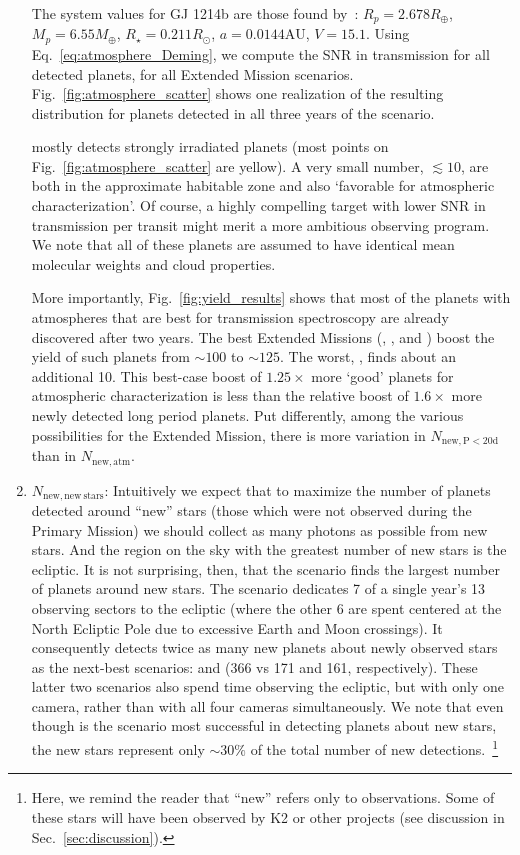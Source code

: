 \begin{enumerate}
	The system values for GJ 1214b are those found
	by~\citet{charbonneau_gj1214b_2009}: $R_p = 2.678R_\oplus$, $M_p = 6.55M_\oplus$,
	$R_\star = 0.211R_\odot$, $a = 0.0144\mathrm{AU}$, $V = 15.1$.
	Using Eq.~\ref{eq:atmosphere_Deming}, we compute the SNR in transmission for all detected planets, for all Extended Mission scenarios.
	Fig.~\ref{fig:atmosphere_scatter} shows one realization of the resulting distribution for planets detected in all three years of the \npole\:scenario.

	\tess mostly detects strongly irradiated planets (most points on Fig.~\ref{fig:atmosphere_scatter} are yellow).
	A very small number, $\lesssim 10$, are both in the approximate habitable zone and also `favorable for atmospheric characterization'.
	Of course, a highly compelling target with lower SNR in transmission per transit might merit a more ambitious \jwst observing program.
	We note that all of these planets are assumed to have identical mean molecular weights and cloud properties.

	More importantly, Fig.~\ref{fig:yield_results} shows that most of the planets with atmospheres that are best for transmission spectroscopy are already discovered after two years.
	The best Extended Missions (\shemiAvoid, \elong, \eshort\:and \hemis) boost the yield of such planets from $\sim\!100$ to $\sim\!125$.
	The worst, \npole, finds about an additional 10.
	This best-case boost of $1.25\times$ more `good' planets for atmospheric characterization is less than the relative boost of $1.6\times$ more newly detected long period planets.
	Put differently, among the various possibilities for the Extended Mission,
        there is more variation in $N_\mathrm{new,P<20d}$ than in $N_\mathrm{new,atm}$.
	
	
	\item $N_\mathrm{new,new\ stars}$:
	  Intuitively we expect that to maximize the number of planets detected 
	  around ``new'' stars (those which were not observed during the Primary 
	  Mission) we should collect as many photons as possible from new stars.
         And the region on the sky with the greatest number of new stars is the ecliptic.
	 It is not surprising, then, that the \elong\:scenario finds the largest number of planets around new stars.
         The \elong\:scenario dedicates 7 of a single year's 13 observing sectors to the ecliptic (where the other 6 are spent centered at the North Ecliptic Pole due to excessive Earth and Moon crossings).
	It consequently detects twice as many new planets about newly observed stars as the next-best scenarios: \eshort\:and \shemiAvoid\:(366 vs 171 and 161, respectively).
	These latter two scenarios also spend time observing the ecliptic, but with 
	only one camera, rather than with all four cameras simultaneously.
	We note that even though \elong\:is the scenario most successful in detecting planets about new stars, the new stars represent only $\sim\!30\%$ of the total number of new detections.~\footnote{Here, we remind the reader that ``new'' refers only to \tess observations. Some of these stars will
          have been observed by K2 or other projects (see discussion in Sec.~\ref{sec:discussion}).}


\end{enumerate}
